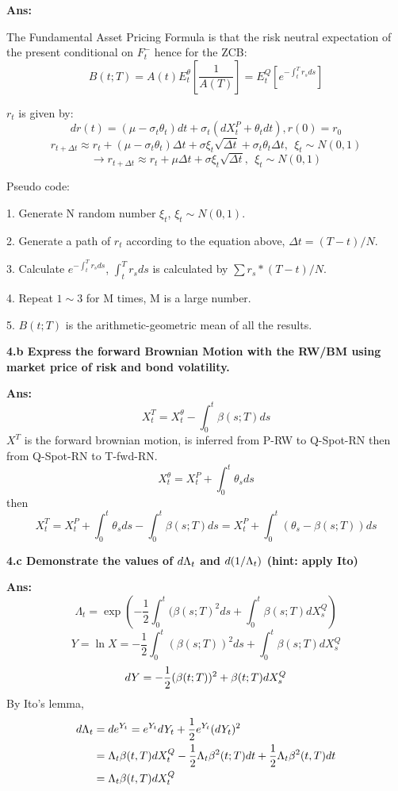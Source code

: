 \documentclass[11pt, notitlepage]{article}
\def\\ln{\mathrm{\ln}}
\def\\exp{\mathrm{\exp}}
\def\\max{\mathrm{\max}}
\def\d{\mathnormal{d}}
\begin{document}
\vspace{5mm}
\color{black}
\textbf {Ans:}

The Fundamental Asset Pricing Formula is that the risk neutral expectation of the present conditional on $F_t^-$ hence for the ZCB:
$$ B(t;T) =  A(t) E_t^\theta [ \frac{1}{A(T)}]  = E_t^Q[e^{-\int_t^T r_sds}]$$

$r_t$ is given by:
$$dr(t) = (\mu - \sigma_t\theta_t)dt + \sigma_t (dX_t^P + \theta_tdt), r(0) = r_0$$
$$ r_{t+\Delta t} \approx r_t + (\mu - \sigma_t \theta_t) \Delta t + \sigma \xi_t \sqrt{\Delta t} +\sigma_t \theta_t \Delta t,~~\xi_t \sim N(0,1)$$
$$\to r_{t+\Delta t} \approx r_t + \mu \Delta t + \sigma \xi_t \sqrt{\Delta t},~~\xi_t \sim N(0,1)$$

Pseudo code:

1. Generate N random number $\xi_t$, $\xi_t \sim N(0,1)$.

2. Generate a path of $r_t$ according to the equation above, $\Delta t = (T-t)/N$.

3. Calculate $e^{-\int_t^T r_s ds}$,  $\int_t^T r_s ds$ is calculated by $\sum r_s * (T-t)/N$.

4. Repeat $1 \sim 3$ for M times, M is a large number.

5. $B(t;T)$ is the arithmetic-geometric mean of all the results.

\vspace{10mm}
\color{red}
\bfseries
4.b Express the forward Brownian Motion with the RW/BM using market price of risk and bond volatility.
\mdseries

\vspace{5mm}
\color{black}
\textbf {Ans:}
$$ X_t^T = X_t^\theta - \int^t_0 \beta(s;T)ds$$
$X^T$ is the forward brownian motion, is inferred from P-RW to Q-Spot-RN then from Q-Spot-RN to T-fwd-RN.
$$X_t^\theta = X_t^P + \int^t_0 \theta_s ds$$
then $$X_t^T = X_t^P + \int^t_0 \theta_s ds - \int^t_0 \beta(s;T)ds = X_t^P + \int^t_0(\theta_s - \beta(s;T))ds$$


\vspace{10mm}
\color{red}
\bfseries
4.c Demonstrate the values of $\d \Lambda_t$ and $\d(1/\Lambda_t)$ (hint: apply Ito)
\mdseries

\vspace{5mm}
\color{black}
\textbf {Ans:}
$$ \Lambda_t = \exp({-\frac{1}{2}\int^t_0(\beta(s;T)^2 ds + \int^t_0 \beta(s;T) dX_s^Q}) $$
$$ Y = \ln X = -\frac{1}{2}\int^t_0(\beta(s;T))^2 ds + \int^t_0 \beta(s;T) dX_s^Q$$
$$\d Y = -\frac{1}{2}(\beta(t;T))^2 + \beta(t;T)dX_s^Q$$
By Ito's lemma,
\begin{equation*}
\begin{aligned}
\d \Lambda_t  &= \d e^{Y_t} = e^{Y_t}\d Y_t+\frac{1}{2} e^{Y_t} (\d Y_t)^2\\
& = \Lambda_t \beta (t,T)dX_t^Q - \frac{1}{2} \Lambda_t \beta^2(t;T)dt + \frac{1}{2} \Lambda_t \beta^2(t,T)dt\\
& = \Lambda_t \beta(t,T)dX_t^Q
\end{aligned}
\end{equation*}
\end{document}
